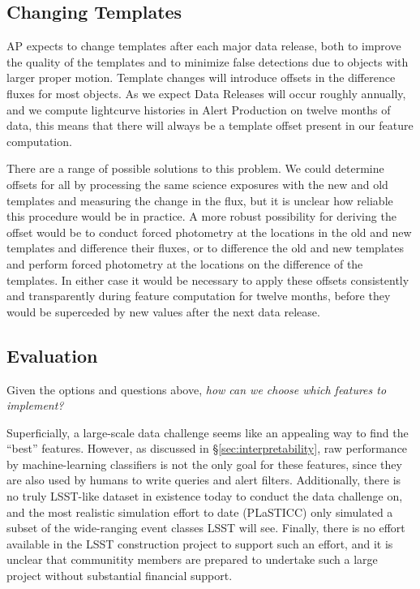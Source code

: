 \documentclass[DM,authoryear,toc]{lsstdoc}
\begin{document}

\subsection{Changing Templates} \label{sec:template_change}

AP expects to change templates after each major data release, both to improve the quality of the templates and to minimize false detections due to objects with larger proper motion.
Template changes will introduce offsets in the difference fluxes for most objects.
As we expect Data Releases will occur roughly annually, and we compute lightcurve histories in Alert Production on twelve months of data, this means that there will always be a template offset present in our feature computation.

There are a range of possible solutions to this problem. 
We could determine offsets for all \DIAObjects by processing the same science exposures with the new and old templates and measuring the change in the \DIASource flux, but it is unclear how reliable this procedure would be in practice.
A more robust possibility for deriving the offset would be to conduct forced photometry at the \DIAObject locations in the old and new templates and difference their fluxes, or to difference the old and new templates and perform forced photometry at the \DIAObject locations on the difference of the templates.
In either case it would be necessary to apply these offsets consistently and transparently during feature computation for twelve months, before they would be superceded by new values after the next data release.  


\subsection{Evaluation}

Given the options and questions above, 
\textit{how can we choose which features to implement?}

Superficially, a large-scale data challenge seems like an appealing way to find the ``best'' features.
However, as discussed in \S \ref{sec:interpretability}, raw performance by machine-learning classifiers is not the only goal for these features, since they are also used by humans to write queries and alert filters.
Additionally, there is no truly LSST-like dataset in existence today to conduct the data challenge on, and the most realistic simulation effort to date (PLaSTICC) only simulated a subset of the wide-ranging event classes LSST will see.
Finally, there is no effort available in the LSST construction project to support such an effort, and it is unclear that communitity members are prepared to undertake such a large project without substantial financial support.
\end{document}
